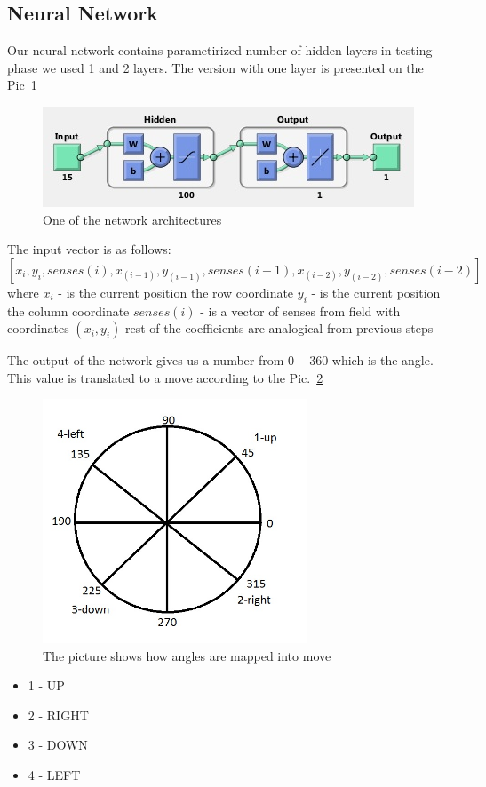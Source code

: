\documentclass[a4paper]{article}
\begin{document}
	\subsection{Neural Network}
	Our neural network contains parametirized number of hidden layers in testing phase we 
	used 1 and 2 layers. The version with one layer is presented on the Pic~\ref{pic:networkExample}
	\begin{figure}[!h]
		\centering	
		\includegraphics[width=\textwidth]{pic/networkExample.jpg}
		\caption{One of the network architectures}
		\label{pic:networkExample}
	\end{figure}
	
 The input vector is as follows:
	$$
		[x_i, y_i, senses(i), x_(i-1), y_(i-1), senses(i-1), x_(i-2), y_(i-2), senses(i-2)]
	$$
	where 
		$x_i$ - is the current position the row coordinate
		$y_i$ - is the current position the column coordinate
		$senses(i)$ - is a vector of senses from field with coordinates $(x_i, y_i)$
		rest of the coefficients are analogical from previous steps
	
	The output of the network gives us a number from $0-360$ which is the angle. This value
	is translated to a move according to the Pic.~\ref{pic:compass}
	\begin{figure}[!h]
	\centering	
	\includegraphics[width=0.7\textwidth]{pic/kompass.jpg}
	\caption{The picture shows how angles are mapped into move}
\label{pic:compass}
\end{figure}
	\begin{itemize}
		\item 1 - UP
		\item 2 - RIGHT
		\item 3 - DOWN
		\item 4 - LEFT
	\end{itemize}
	
\end{document}
